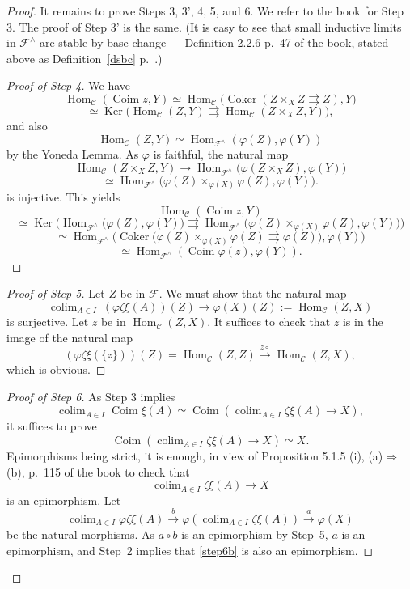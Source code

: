 \documentclass[12pt]{article}
\theoremstyle{remark}
\theoremstyle{definition}
\newcommand{\C}{\mathcal C}
\newcommand{\F}{\mathcal F}
\newcommand{\pp}{\varphi}
\newcommand{\then}{\Rightarrow}
\DeclareMathOperator*{\colim}{colim}
\DeclareMathOperator{\Coim}{Coim}
\DeclareMathOperator{\Coker}{Coker}
\DeclareMathOperator{\Hom}{Hom}
\DeclareMathOperator{\Ker}{Ker}
\begin{document}
\begin{proof}
It remains to prove Steps 3, 3', 4, 5, and 6. We refer to the book for Step 3. The proof of Step 3' is the same. (It is easy to see that small inductive limits in $\F^\wedge$ are stable by base change --- Definition 2.2.6 p.~47 of the book, stated above as Definition~\ref{dsbc} p.~\pageref{dsbc}.) 

\begin{proof}[Proof of Step 4] 
We have 
$$
\Hom_\C(\Coim z,Y)\simeq\Hom_\C\big(\Coker(Z\times_XZ\rightrightarrows Z),Y\big)
$$
$$
\simeq\Ker\big(\Hom_\C(Z,Y)\rightrightarrows\Hom_\C(Z\times_XZ,Y)\big),
$$ 
and also 
$$
\Hom_\C(Z,Y)\simeq\Hom_{\F^\wedge}(\pp(Z),\pp(Y))
$$ 
by the Yoneda Lemma. As $\pp$ is faithful, the natural map 
$$
\Hom_\C(Z\times_XZ,Y)\to\Hom_{\F^\wedge}\big(\pp(Z\times_XZ),\pp(Y)\big)
$$
$$
\simeq\Hom_{\F^\wedge}\big(\pp(Z)\times_{\pp(X)}\pp(Z),\pp(Y)\big).
$$ 
is injective. This yields 
$$
\Hom_\C(\Coim z,Y)
$$
$$
\simeq\Ker\Big(\Hom_{\F^\wedge}\big(\pp(Z),\pp(Y)\big)\rightrightarrows\Hom_{\F^\wedge}\big(\pp(Z)\times_{\pp(X)}\pp(Z),\pp(Y)\big)\Big)
$$
$$
\simeq\Hom_{\F^\wedge}\Big(\Coker\big(\pp(Z)\times_{\pp(X)}\pp(Z)\rightrightarrows\pp(Z)\big),\pp(Y)\Big)
$$
$$
\simeq\Hom_{\F^\wedge}(\Coim\pp(z),\pp(Y)).
$$ 
\end{proof}

\begin{proof}[Proof of Step 5]
Let $Z$ be in $\F$. We must show that the natural map 
$$
\colim_{A\in I}\ (\pp\zeta\xi(A))(Z)\to\pp(X)(Z):=\Hom_\C(Z,X) 
$$
is surjective. Let $z$ be in $\Hom_\C(Z,X)$. It suffices to check that $z$ is in the image of the natural map 
$$
(\pp\zeta\xi(\{z\}))(Z)=\Hom_\C(Z,Z)\xrightarrow{z\circ}\Hom_\C(Z,X),
$$
which is obvious. 
\end{proof}

\begin{proof}[Proof of Step 6] 
As Step 3 implies 
$$
\colim_{A\in I}\Coim\xi(A)\simeq\Coim\left(\colim_{A\in I}\zeta\xi(A)\to X\right),
$$ 
it suffices to prove 
%
\begin{equation}\label{step6a}
\Coim\left(\colim_{A\in I}\zeta\xi(A)\to X\right)\simeq X.
\end{equation}
% 
Epimorphisms being strict, it is enough, in view of Proposition 5.1.5 (i), (a)$\then$(b), p.~115 of the book to check that 
%
\begin{equation}\label{step6b}
\colim_{A\in I}\zeta\xi(A)\to X
\end{equation}
% 
is an epimorphism. Let 
$$
\colim_{A\in I}\pp\zeta\xi(A)\xrightarrow{b}\pp\left(\colim_{A\in I}\zeta\xi(A)\right)\xrightarrow{a}\pp(X)
$$
be the natural morphisms. As $a\circ b$ is an epimorphism by Step~5, $a$ is an epimorphism, and Step~2 implies that \eqref{step6b} is also an epimorphism. 
\end{proof}
\end{proof}
\end{document}
